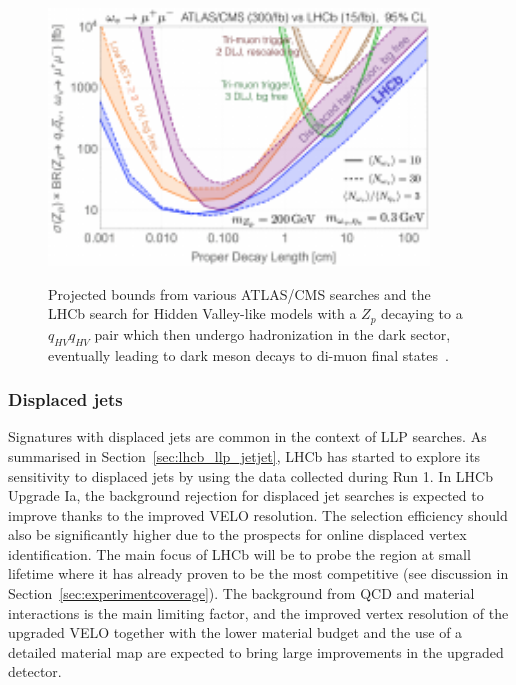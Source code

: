 \begin{figure}[t]
  \centering
  {\includegraphics[width=0.9\textwidth]{figures/ulhcb_darkmesons_dileptons.pdf}}
  \caption{Projected bounds from various ATLAS/CMS searches and the LHCb search for Hidden Valley-like models with a $Z_p$ decaying to a $q_{HV}q_{HV}$ pair which then undergo hadronization in the dark sector, eventually leading to dark meson decays to di-muon final states~\cite{Pierce:2017taw}.}
  \label{fig:ulhcb_hv_dimuons}
\end{figure}

\subsubsection{Displaced jets}

Signatures with displaced jets are common in the context of LLP searches. As summarised in Section~\ref{sec:lhcb_llp_jetjet}, LHCb has started to explore its sensitivity to displaced jets by using the data collected during Run 1. In LHCb Upgrade Ia, the background rejection for displaced jet searches is expected to improve thanks to the improved VELO resolution. The selection efficiency should also be significantly higher due to the prospects for online displaced vertex identification. The main focus of LHCb will be to probe the region at small lifetime where it has already proven to be the most competitive (see discussion in Section~\ref{sec:experimentcoverage}). The background from QCD and material interactions is the main limiting factor, and the improved vertex resolution of the upgraded VELO together with the lower material budget and the use of a detailed material map are expected to bring large improvements in the upgraded detector.

